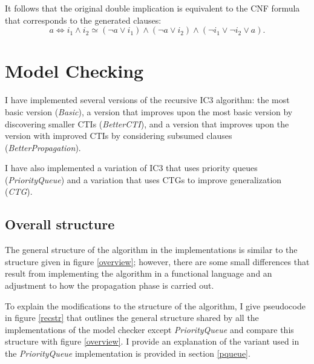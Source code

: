 \documentclass[12pt,a4paper,twoside,openright]{report}
\begin{document}
{It follows that the original double implication is equivalent to the CNF
formula that corresponds to the generated clauses:
$$a \Leftrightarrow i_1 \wedge i_2 \simeq
(\neg a \vee i_1) \wedge (\neg a \vee i_2) \wedge (\neg i_1 \vee \neg i_2 \vee a).$$


\section{Model Checking}

I have implemented several versions of the recursive IC3 algorithm:
the most basic version (\emph{Basic}), a version that
improves upon the most basic version by discovering smaller CTIs (\emph{BetterCTI}),
and a version that improves upon the version with improved CTIs by considering subsumed clauses
(\emph{BetterPropagation}).

I have also implemented a variation of IC3 that uses priority queues (\emph{PriorityQueue}) and a
variation that uses CTGs to improve generalization (\emph{CTG}).

\subsection{Overall structure}

The general structure of the algorithm in the implementations is similar
to the structure given in figure \ref{overview}; however, there are some
small differences that result from implementing the algorithm in a
functional language and an adjustment to how the propagation phase is
carried out.

To explain the modifications to the structure of the algorithm,
I give pseudocode in figure \ref{recstr}
that outlines the general structure shared by all the
implementations of the model checker except {\it PriorityQueue}
and compare this structure with figure \ref{overview}.
I provide an explanation of the variant used in the
{\it PriorityQueue} implementation is provided in section
\ref{pqueue}.

}
\end{document}
